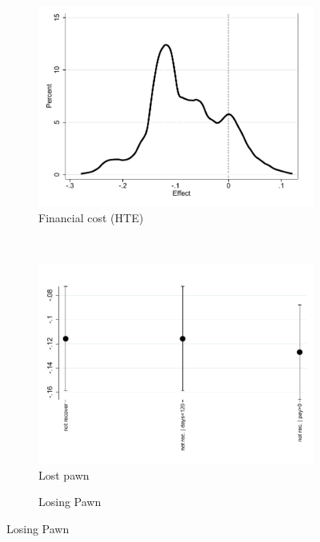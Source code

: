 \documentclass[oneside,11pt]{article}
\begin{document}
\begin{figure}[H]
\begin{center}
        \bigskip
    
     \begin{subfigure}{0.42\textwidth}
         \caption{Financial cost (HTE)}
         \centering
         \includegraphics[width=\textwidth]{Figuras/he_dist_eff_cost_loan_pro_2.pdf}
     \end{subfigure}
    ~
    ~
    \bigskip
    \begin{subfigure}{0.42\textwidth}
        \caption{Lost pawn}
        \centering
        \includegraphics[width=\textwidth]{Figuras/def_te_pro_2.pdf}
    \end{subfigure}
    \begin{subfigure}{0.42\textwidth}
    \caption{Losing Pawn}
        \centering

\end{subfigure}
\end{center}
\end{figure}
\end{document}
